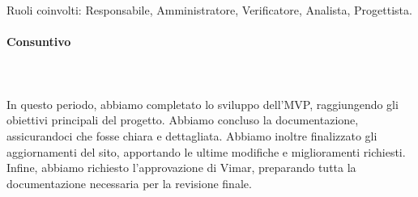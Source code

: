 \\ \hspace{1cm} \\
Ruoli coinvolti: Responsabile, Amministratore, Verificatore, Analista, Progettista.
\begin{table}[H]
\centering
{}
\caption{Preventivo dell'impegno orario di ciascun membro durante il periodo VIII}
\end{table}

\paragraph{Consuntivo} \hspace{1cm} 
\\ \hspace{1cm} \\
In questo periodo, abbiamo completato lo sviluppo dell’MVP, raggiungendo gli obiettivi principali del progetto. Abbiamo concluso la documentazione, assicurandoci che fosse chiara e dettagliata. Abbiamo inoltre finalizzato gli aggiornamenti del sito, apportando le ultime modifiche e miglioramenti richiesti. Infine, abbiamo richiesto l’approvazione di Vimar, preparando tutta la documentazione necessaria per la revisione finale.



